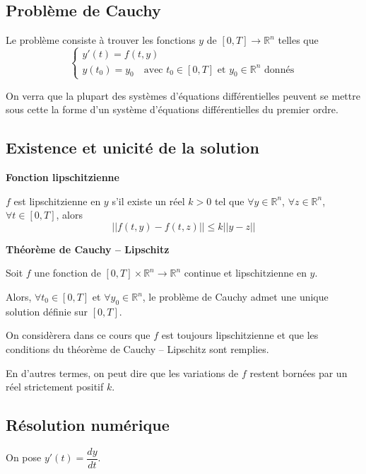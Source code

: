 \documentclass[10pt]{article}
\begin{document}
\subsection{Problème de Cauchy}

\begin{prob}
Le problème consiste à trouver les fonctions $y$ de $[0,T]\rightarrow \mathbb{R}^n$ telles que
$$
\left\{
\begin{array}{l}
y'(t)=f(t,y) \\
y(t_0)=y_0 \quad \text{avec } t_0\in [0,T] \text{ et } y_0\in \mathbb{R}^n \text{ donnés}
\end{array}
\right.
 $$ 
\end{prob}

 
On verra que la plupart des systèmes d'équations différentielles peuvent se mettre sous cette la forme d'un système d'équations différentielles du premier ordre. 



\subsection{Existence et unicité de la solution}

\begin{defi}
\textbf{Fonction lipschitzienne}

$f$ est lipschitzienne en $y$ s'il existe un réel $k>0$ tel que $\forall y\in\mathbb{R}^n$, $\forall z\in\mathbb{R}^n$, $\forall t\in[0,T]$, alors 
$$
||f(t,y)-f(t,z)||\leq k||y-z||
$$

\end{defi}

\begin{theo}
\textbf{Théorème de Cauchy -- Lipschitz}

Soit $f$ une fonction de $[0,T] \times \mathbb{R}^n \rightarrow \mathbb{R}^n$ continue et lipschitzienne en $y$. 

Alors, $\forall t_0 \in [0,T]$ et $\forall y_0 \in \mathbb{R}^n$, le problème de Cauchy admet une unique solution définie sur $[0,T]$.

\end{theo}

On considèrera dans ce cours que $f$ est toujours lipschitzienne et que les conditions du théorème de Cauchy -- Lipschitz sont remplies. 

En d'autres termes, on peut dire que les variations de $f$ restent bornées par un réel strictement positif $k$.

\subsection{Résolution numérique}
On pose $y'(t)=\dfrac{dy}{dt}$.
\end{document}
